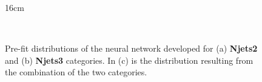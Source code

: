 \begin{figure}[hbtp]{16cm}
	\caption{Pre-fit distributions of the neural network developed for (a) \textbf{Njets2} and (b) \textbf{Njets3} categories. In (c) is the distribution resulting from the combination of the two categories.}
	\centering
	\\

\end{figure}
